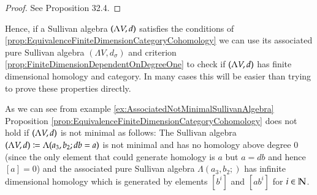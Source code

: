 \begin{proof}
 See \cite{Felix2001} Proposition 32.4.
\end{proof}

Hence, if a Sullivan algebra $(\Lambda V,d)$ satisfies the conditions of \ref{prop:EquivalenceFiniteDimensionCategoryCohomology}
we can use its associated pure Sullivan algebra $(\Lambda V, d_{\sigma})$ and criterion \ref{prop:FiniteDimensionDependentOnDegreeOne}
to check if $(\Lambda V,d)$ has finite dimensional homology and category. In many cases this will be easier than 
trying to prove these properties directly.

\begin{Remark}
 As we can see from example \ref{ex:AssociatedNotMinimalSullivanAlgebra} Proposition 
 \ref{prop:EquivalenceFiniteDimensionCategoryCohomology} does not hold if $(\Lambda V,d)$ is not minimal as follows:
 The Sullivan algebra $(\Lambda V,d) \coloneqq \Lambda( a_3, b_2 ; db = a)$ is not minimal and 
 has no homology above degree $0$ (since
 the only element that could generate homology is $a$ but $a = db$ and hence $[a] = 0$) and the associated
 pure Sullivan algebra $\Lambda (a_3, b_2 ;)$ has infinite dimensional homology which is generated by elements
 $[b^i]$ and $[ab^i]$ for $i \in \mathbb{N}$.
\end{Remark}
